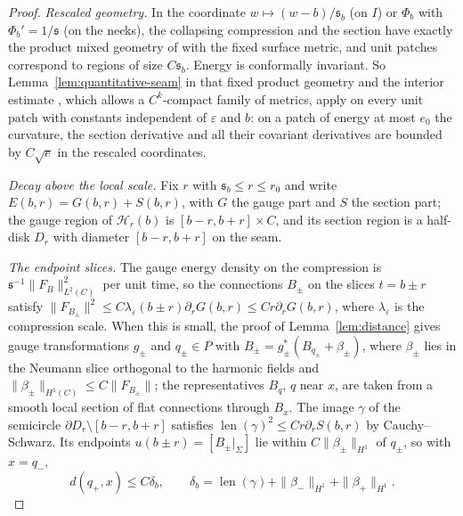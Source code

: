 \documentclass[11pt]{amsart}
\theoremstyle{definition}
\theoremstyle{remark}
\theoremstyle{plain}
\numberwithin{equation}{section}
\newcommand{\len}{\operatorname{len}}
\newcommand{\eps}{\varepsilon}
\begin{document}
\begin{proof}
\emph{Rescaled geometry.} In the coordinate $w\mapsto(w-b)/{\mathfrak s}_b$ (on
$I$) or $\Phi_b$ with $\Phi_b'=1/{\mathfrak s}$ (on the necks), the collapsing
compression and the section have exactly the product mixed geometry of
\cite[(1.1)]{DFL-mixed} with the fixed surface metric, and unit patches
correspond to regions of size $C{\mathfrak s}_b$. Energy is conformally
invariant. So Lemma~\ref{lem:quantitative-seam} in that fixed product
geometry and the interior estimate \cite[Lemma~4.50]{DFL-mixed},
which allows a $C^k$-compact family of metrics, apply on every unit patch with constants independent of $\eps$
and $b$: on a patch of energy at most $e_0$ the curvature, the section
derivative and all their covariant derivatives are bounded by $C\sqrt e$
in the rescaled coordinates.

\emph{Decay above the local scale.} Fix $r$ with ${\mathfrak s}_b\le r\le r_0$ and write
$E(b,r)=G(b,r)+S(b,r)$, with $G$ the gauge part and $S$ the section part; the gauge region of
$\mathcal H_r(b)$ is $[b-r,b+r]\times C$, and its section region is a half-disk $D_r$ with diameter
$[b-r,b+r]$ on the seam.

\emph{The endpoint slices.} The gauge energy density on the compression is
${\mathfrak s}^{-1}\|F_B\|^2_{L^2(C)}$ per unit time, so the connections $B_\pm$ on the slices
$t=b\pm r$ satisfy $\|F_{B_\pm}\|^2\le C\lambda_\eps(b\pm r)\partial_rG(b,r)\le Cr\partial_rG(b,r)$,
where $\lambda_\eps$ is the compression scale. When
this is small, the proof of Lemma~\ref{lem:distance} gives gauge transformations $g_\pm$ and
$q_\pm\in P$ with $B_\pm=g_\pm^*(B_{q_\pm}+\beta_\pm)$, where $\beta_\pm$ lies in the Neumann slice
orthogonal to the harmonic fields and $\|\beta_\pm\|_{H^1(C)}\le C\|F_{B_\pm}\|$; the
representatives $B_q$, $q$ near $x$, are taken from a smooth local section of flat connections
through $B_x$. The image $\gamma$ of the semicircle $\partial D_r\setminus[b-r,b+r]$ satisfies
$\len(\gamma)^2\le Cr\partial_rS(b,r)$ by Cauchy--Schwarz. Its endpoints $u(b\pm r)=[B_\pm|_\Sigma]$
lie within $C\|\beta_\pm\|_{H^1}$ of $q_\pm$, so with $x=q_-$,
\[
d(q_+,x)\le C\delta_b,\qquad \delta_b=\len(\gamma)+\|\beta_-\|_{H^1}+\|\beta_+\|_{H^1}.
\]


\end{proof}
\end{document}
